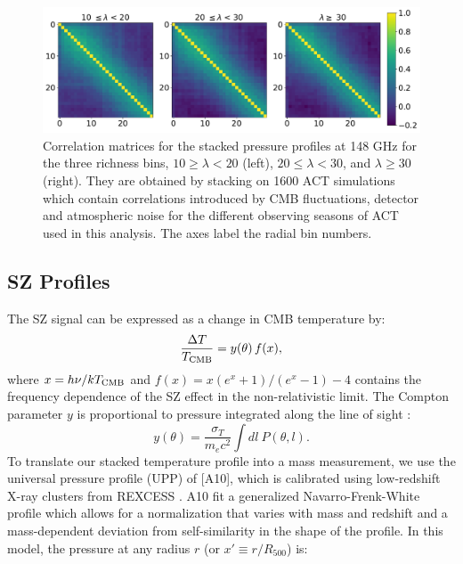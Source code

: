\documentclass[a4paper,fleqn,usenatbib]{mnras}
\begin{document}
\begin{figure}
\centering
  \includegraphics[width=1.75\columnwidth]{correlation_1600_coadd_act_actpol_148_tophat_zbin01_all.pdf}
  \caption{Correlation matrices for the stacked pressure profiles at 148 GHz for the three richness bins, $10 \geq \lambda < 20$ (left), $20 \leq \lambda < 30$, and $\lambda \geq 30$ (right). They are obtained by stacking on 1600 ACT simulations which contain correlations introduced by CMB fluctuations, detector and atmospheric noise for the different observing seasons of ACT used in this analysis. The axes label the radial bin numbers.}
  \label{fig:covariance}
\end{figure}

\subsection{SZ Profiles}
The SZ signal can be expressed as a change in CMB temperature by: 
\begin{equation}
\centering
  \frac{\Delta T}{T_{\rm CMB}} = y( \theta ) \, f( x ) ,
\end{equation}
where $x = {h \nu}/{k T_{\rm CMB}}$ and $f(x) = x ({e^{x} + 1})/{(e^{x}-1)} - 4$ contains the frequency dependence of the SZ effect in the non-relativistic limit. The Compton parameter $y$ is proportional to pressure integrated along the line of sight \citep{1972CoASP...4..173S,1970CoASP...2...66S}:
\begin{equation}
  y(\theta) = \frac{\sigma_{T}}{m_{e} c^{2}} \int dl\  P(\theta, l) . \end{equation}
To translate our stacked temperature profile into a mass measurement, we use the universal pressure profile (UPP) of \cite{2010A&A...517A..92A} [A10], which is calibrated using low-redshift X-ray clusters from REXCESS \citep{2007A&A...469..363B}. 
A10 fit a generalized Navarro-Frenk-White profile which allows for a normalization that varies with mass and redshift and a mass-dependent deviation from self-similarity in the shape of the profile. 
In this model, the pressure at any radius $r$ (or $x' \equiv r/R_{500}$) is:
\end{document}
